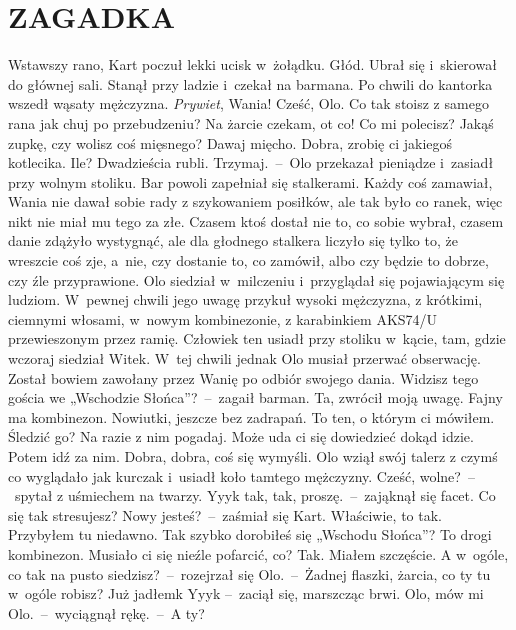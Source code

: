 \documentclass[../MAIN.tex]{subfiles}
\begin{document}
\section*{ZAGADKA}
\mm Wstawszy rano, Kart poczuł lekki ucisk w~żołądku. Głód. Ubrał się i~skierował do głównej sali. Stanął przy ladzie i~czekał na barmana. Po chwili do kantorka wszedł wąsaty mężczyzna.
\sx \textit{Prywiet}, Wania!
\xx Cześć, Olo. Co tak stoisz z samego rana jak chuj po przebudzeniu?
\xx Na żarcie czekam, ot co! Co mi polecisz?
\xx Jakąś zupkę, czy wolisz coś mięsnego?
\xx Dawaj mięcho.
\xx Dobra, zrobię ci jakiegoś kotlecika.
\xx Ile?
\xx Dwadzieścia rubli.
\xx Trzymaj.~--~Olo przekazał pieniądze i~zasiadł przy wolnym stoliku.
\qd
\hspace{30.5em}Bar powoli zapełniał się stalkerami. Każdy coś zamawiał, Wania nie dawał sobie rady z szykowaniem posiłków, ale tak było co ranek, więc nikt nie miał mu tego za złe. Czasem ktoś dostał nie to, co sobie wybrał, czasem danie zdążyło wystygnąć, ale dla głodnego stalkera liczyło się tylko to, że wreszcie coś zje, a~nie, czy dostanie to, co zamówił, albo czy będzie to dobrze, czy źle przyprawione.
\pp
Olo siedział w~milczeniu i~przyglądał się pojawiającym się ludziom. W~pewnej chwili jego uwagę przykuł wysoki mężczyzna, z krótkimi, ciemnymi włosami, w~nowym kombinezonie, z karabinkiem AKS74/U przewieszonym przez ramię. Człowiek ten usiadł przy stoliku w~kącie, tam, gdzie wczoraj siedział Witek. W~tej chwili jednak Olo musiał przerwać obserwację. Został bowiem zawołany przez Wanię po odbiór swojego dania.
\sx Widzisz tego gościa we „Wschodzie Słońca”?~--~zagaił barman.
\xx Ta, zwrócił moją uwagę. Fajny ma kombinezon.
\xx Nowiutki, jeszcze bez zadrapań. To ten, o którym ci mówiłem.
\xx Śledzić go?
\xx Na razie z nim pogadaj. Może uda ci się dowiedzieć dokąd idzie. Potem idź za nim.
\xx Dobra, dobra, coś się wymyśli.
\qd
\hspace{15em}Olo wziął swój talerz z czymś co wyglądało jak kurczak i~usiadł koło tamtego mężczyzny.
\sx Cześć, wolne?~--~spytał z uśmiechem na twarzy.
\xx Yyy\3k tak, tak, proszę.~--~zająknął się facet.
\xx Co się tak stresujesz? Nowy jesteś?~--~zaśmiał się Kart.
\xx Właściwie, to tak. Przybyłem tu niedawno.
\xx Tak szybko dorobiłeś się „Wschodu Słońca”? To drogi kombinezon. Musiało ci się nieźle pofarcić, co?
\xx Tak. Miałem szczęście.
\xx A w~ogóle, co tak na pusto siedzisz?~--~rozejrzał się Olo.~--~Żadnej flaszki, żarcia, co ty tu w~ogóle robisz?
\xx Już jadłem\3k Yyy\3k --~zaciął się, marszcząc brwi.
\xx Olo, mów mi Olo.~--~wyciągnął rękę.~--~A ty?
\end{document}
